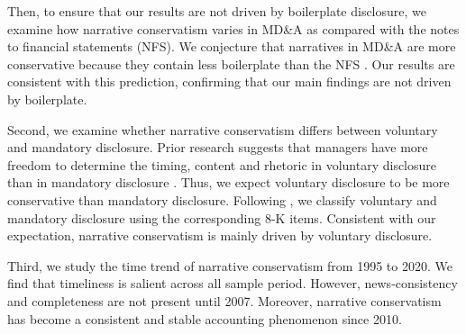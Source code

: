 \documentclass[letterpaper,12pt]{article}
\begin{document}
\begin{spacing}{1.5}
Then, to ensure that our results are not driven by boilerplate disclosure, we examine how narrative conservatism varies in MD\&A as compared with the notes to financial statements (NFS). We conjecture that narratives in MD\&A are more conservative because they contain less boilerplate than the NFS \cite{secFinancialReportingManual2019}. Our results are consistent with this prediction, confirming that our main findings are not driven by boilerplate. 

Second, we examine whether narrative conservatism differs between voluntary and mandatory disclosure. Prior research suggests that managers have more freedom to determine the timing, content and rhetoric in voluntary disclosure than in mandatory disclosure \cite{segalAreManagersStrategic2016}. Thus, we expect voluntary disclosure to be more conservative than mandatory disclosure. Following , we classify voluntary and mandatory disclosure using the corresponding 8-K items. Consistent with our expectation, narrative conservatism is mainly driven by voluntary disclosure. 

Third, we study the time trend of narrative conservatism from 1995 to 2020. We find that timeliness is salient across all sample period. However, news-consistency and completeness are not present until 2007. Moreover, narrative conservatism has become a consistent and stable accounting phenomenon since 2010.



\end{spacing}
\end{document}
